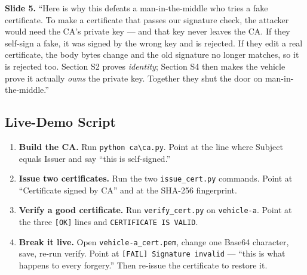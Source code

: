 \documentclass[11pt,a4paper]{article}
\begin{document}
\textbf{Slide 5.} ``Here is why this defeats a man-in-the-middle who tries a fake
certificate. To make a certificate that passes our signature check, the attacker
would need the CA's private key --- and that key never leaves the CA. If they
self-sign a fake, it was signed by the wrong key and is rejected. If they edit a
real certificate, the body bytes change and the old signature no longer matches,
so it is rejected too. Section S2 proves \emph{identity}; Section S4 then makes
the vehicle prove it actually \emph{owns} the private key. Together they shut the
door on man-in-the-middle.''

\subsection{Live-Demo Script}
\begin{enumerate}
  \item \textbf{Build the CA.} Run \texttt{python ca\textbackslash ca.py}. Point
        at the line where Subject equals Issuer and say ``this is self-signed.''
  \item \textbf{Issue two certificates.} Run the two
        \texttt{issue\_cert.py} commands. Point at ``Certificate signed by CA''
        and at the SHA-256 fingerprint.
  \item \textbf{Verify a good certificate.} Run \texttt{verify\_cert.py} on
        \texttt{vehicle-a}. Point at the three \texttt{[OK]} lines and
        \texttt{CERTIFICATE IS VALID}.
  \item \textbf{Break it live.} Open \texttt{vehicle-a\_cert.pem}, change one
        Base64 character, save, re-run verify. Point at
        \texttt{[FAIL] Signature invalid} --- ``this is what happens to every
        forgery.'' Then re-issue the certificate to restore it.
\end{enumerate}
\end{document}
